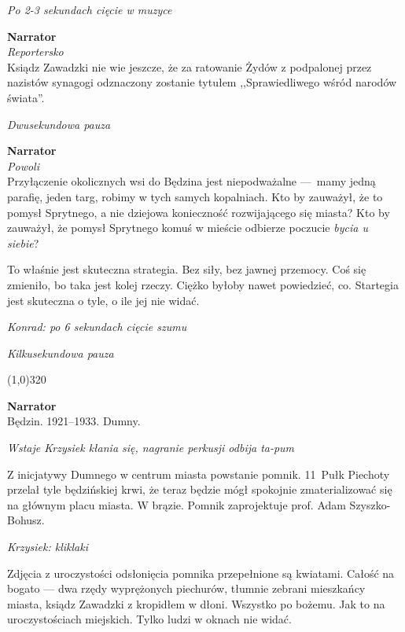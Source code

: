 \documentclass[11pt,a4paper,oneside]{article}
\begin{document}
{\color{light-gray} \emph{Po 2-3 sekundach cięcie w muzyce}}

\textbf{Narrator}\\
{\color{light-gray} \emph{Reportersko}}\\
Ksiądz Zawadzki nie wie jeszcze, że za ratowanie Żydów z podpalonej
przez nazistów synagogi odznaczony zostanie tytułem ,,Sprawiedliwego
wśród narodów świata''.

{\color{light-gray} \emph{Dwusekundowa pauza}}

\textbf{Narrator}\\
{\color{light-gray} \emph{Powoli}}\\
Przyłączenie okolicznych wsi do Będzina jest niepodważalne \mbox{---}~mamy
jedną parafię, jeden targ, robimy w  tych samych kopalniach. Kto by
zauważył, że to pomysł Sprytnego, a nie dziejowa konieczność
rozwijającego się miasta?  Kto by zauważył, że pomysł Sprytnego komuś
w mieście odbierze poczucie \emph{bycia u siebie}?

To właśnie jest skuteczna strategia. Bez siły, bez jawnej przemocy.
Coś się zmieniło, bo taka jest kolej rzeczy.  Ciężko byłoby nawet
powiedzieć, co. Startegia jest skuteczna o tyle, o ile jej nie widać. 

{\color{konrad} \emph{Konrad: po 6 sekundach cięcie szumu}}

{\color{light-gray} \emph{Kilkusekundowa pauza}}


\line(1,0){320}

\textbf{Narrator}\\
Będzin. 1921--1933. Dumny. 

{\color{light-gray} \emph{Wstaje Krzysiek kłania się, nagranie
perkusji odbija ta-pum}}

Z inicjatywy Dumnego w centrum miasta powstanie pomnik. 11~Pułk
Piechoty przelał tyle będzińskiej krwi, że teraz będzie mógł spokojnie
zmaterializować się na głównym placu miasta. W brązie. Pomnik
zaprojektuje prof. Adam Szyszko-Bohusz.

{\color{krzysiek} \emph{Krzysiek: kliklaki}}

Zdjęcia z uroczystości odsłonięcia pomnika przepełnione są kwiatami.
Całość na bogato --- dwa rzędy wyprężonych piechurów, tłumnie zebrani
mieszkańcy miasta, ksiądz Zawadzki z kropidłem w dłoni.  Wszystko po
bożemu.  Jak to na uroczystościach miejskich.  Tylko ludzi w oknach
nie widać.
\end{document}
